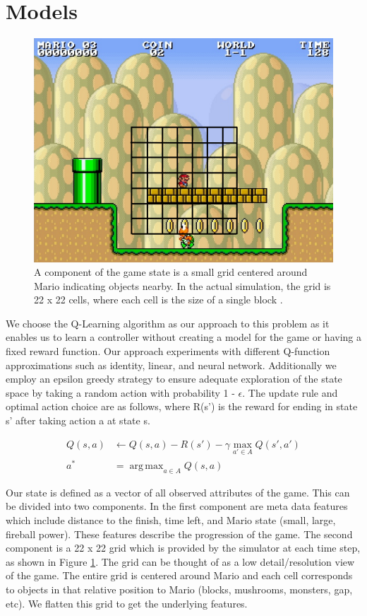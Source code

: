 \documentclass[12pt]{article}
\DeclareMathOperator*{\argmax}{arg\,max}
\begin{document}
\section{Models}

\begin{figure}[h]
\centering
\includegraphics[scale=0.5]{imgs/mario_grid}
\caption{A component of the game state is a small grid centered around Mario indicating objects nearby. In the actual simulation, the grid is 22 x 22 cells, where each cell is the size of a single block \cite{karakovskiy2012mario}.}
\label{mario_grid}
\end{figure}

We choose the Q-Learning algorithm as our approach to this problem as it enables us to learn a controller without creating a model for the game or having a fixed reward function. Our approach experiments with different Q-function approximations such as identity, linear, and neural network. Additionally we employ an epsilon greedy strategy to ensure adequate exploration of the state space by taking a random action with probability 1 - $\epsilon$. The update rule and optimal action choice are as follows, where R(s') is the reward for ending in state s' after taking action a at state s.

\begin{align*}
Q(s,a) &\leftarrow Q(s,a) - R(s') - \gamma \max_{a' \in A} Q(s',a')\\
a^* &= \argmax_{a \in A} Q(s,a)
\end{align*}

Our state is defined as a vector of all observed attributes of the game. This can be divided into two components. In the first component are meta data features which include distance to the finish, time left, and Mario state (small, large, fireball power). These features describe the progression of the game. The second component is a 22 x 22 grid which is provided by the simulator at each time step, as shown in Figure \ref{mario_grid}. The grid can be thought of as a low detail/resolution view of the game. The entire grid is centered around Mario and each cell corresponds to objects in that relative position to Mario (blocks, mushrooms, monsters, gap, etc). We flatten this grid to get the underlying features.
\end{document}
